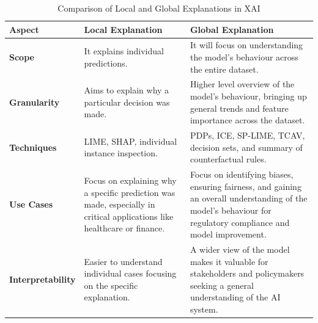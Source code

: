 \documentclass[10pt,journal,compsoc]{IEEEtran}
\begin{document}
\begin{table}[h]
    \centering
    \small
    \begin{tabularx}{\columnwidth}{|p{1.8cm}|X|X|}
        \hline
        \textbf{Aspect}           & \textbf{Local Explanation}                                                                                              & \textbf{Global Explanation}                                                                                                                                    \\
        \hline
        \textbf{Scope}            & It explains individual predictions.                                                                                     & It will focus on understanding the model's behaviour across the entire dataset.                                                                                \\
        \hline
        \textbf{Granularity}      & Aims to explain why a particular decision was made.                                                                     & Higher level overview of the model's behaviour, bringing up general trends and feature importance across the dataset.                                          \\
        \hline
        \textbf{Techniques}       & LIME, SHAP, individual instance inspection.                                                                             & PDPs, ICE, SP-LIME, TCAV, decision sets, and summary of counterfactual rules.\cite{phillips2020four}                                                               \\
        \hline
        \textbf{Use Cases}        & Focus on explaining why a specific prediction was made, especially in critical applications like healthcare or finance. & Focus on identifying biases, ensuring fairness, and gaining an overall understanding of the model's behaviour for regulatory compliance and model improvement. \\
        \hline
        \textbf{Interpretability} & Easier to understand individual cases focusing on the specific explanation.                                        & A wider view of the model makes it valuable for stakeholders and policymakers seeking a general understanding of the AI system.                                \\
        \hline
    \end{tabularx}
    \caption{Comparison of Local and Global Explanations in XAI}
    \label{tab:xai_comparison}
\end{table}
\end{document}
